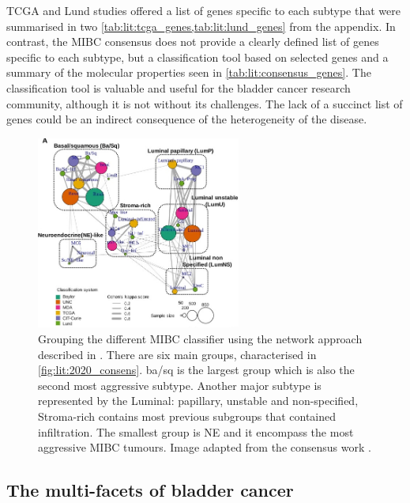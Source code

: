 TCGA and Lund studies offered a list of genes specific to each subtype that were summarised in two \cref{tab:lit:tcga_genes,tab:lit:lund_genes} from the appendix. In contrast, the MIBC consensus does not provide a clearly defined list of genes specific to each subtype, but a classification tool based on selected genes and a summary of the molecular properties seen in \cref{tab:lit:consensus_genes}. The classification tool is valuable and useful for the bladder cancer research community, although it is not without its challenges. The lack of a succinct list of genes could be an indirect consequence of the heterogeneity of the disease.


\begin{figure}[!htb]    
    \centering
\includegraphics[width=0.6\textwidth,height=0.6\textheight,keepaspectratio]{Sections/Lit_review/Resources/consensus_network_classifier.jpg}
    \caption[Network of the datasets involved in the MIBC consensus]{Grouping the different MIBC classifier using the network approach described in \cite{Guinney2015-fy}. There are six main groups, characterised in \cref{fig:lit:2020_consens}. \acrfull{ba/sq} is the largest group which is also the second most aggressive subtype. Another major subtype is represented by the Luminal: papillary, unstable and non-specified, Stroma-rich contains most previous subgroups that contained infiltration. The smallest group is \gls{NE} and it encompass the most aggressive MIBC tumours. Image adapted from the consensus work \citet{Kamoun2020-tj}.}
    \label{fig:lit:consensus_network}
\end{figure}




\subsection{The multi-facets of bladder cancer} \label{s:lit:bladder_other}

